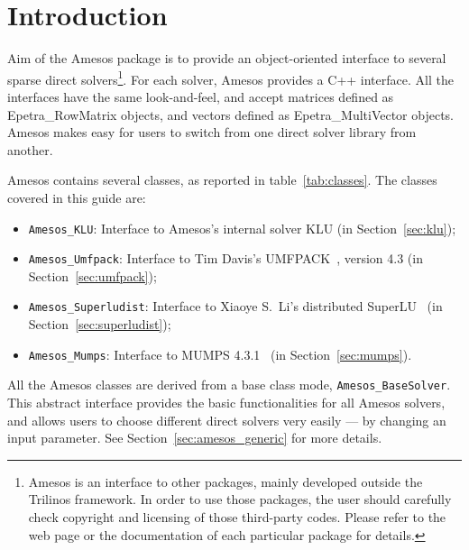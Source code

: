 \documentclass[11pt]{SANDreport}
\begin{document}
\smallskip


\clearpage

\SANDmain


\tableofcontents

\clearpage

\section{Introduction}

Aim of the Amesos package is to provide an object-oriented interface to
several sparse direct solvers\footnote{Amesos is an interface to other
  packages, mainly developed outside the Trilinos framework. In order to
  use those packages, the user should carefully check copyright and
  licensing of those third-party codes.  Please refer to the web page or
  the documentation of each particular package for details.}. For each
solver, Amesos provides a C++ interface. All the interfaces have the
same look-and-feel, and accept matrices defined as Epetra\_RowMatrix
objects, and vectors defined as Epetra\_MultiVector objects. Amesos
makes easy for users to switch from one direct solver library from
another.

Amesos contains several classes, as reported in table~\ref{tab:classes}.
The classes covered in this guide are:
\begin{itemize}
\item \verb!Amesos_KLU!: Interface to Amesos's internal solver KLU (in
  Section~\ref{sec:klu});
\item \verb!Amesos_Umfpack!: Interface to Tim Davis's
  UMFPACK~\cite{umfpack-home-page}, version 4.3 (in Section~\ref{sec:umfpack});
\item \verb!Amesos_Superludist!: Interface to Xiaoye S.~Li's distributed
  SuperLU~\cite{superlu-home-page} (in Section~\ref{sec:superludist});
\item \verb!Amesos_Mumps!: Interface to MUMPS
  4.3.1~\cite{mumps-home-page} (in Section~\ref{sec:mumps}).
\end{itemize}

All the Amesos classes are derived from a base class mode,
\verb!Amesos_BaseSolver!. This abstract interface provides the basic
functionalities for all Amesos solvers, and allows users to choose
different direct solvers very easily --- by changing an input parameter.
See Section~\ref{sec:amesos_generic} for more details.
\end{document}

